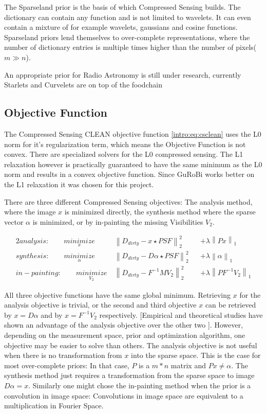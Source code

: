 The Sparseland prior is the basis of which Compressed Sensing builds. The dictionary can contain any function and is not limited to wavelets. It can even contain a mixture of for example wavelets, gaussians and cosine functions. Sparseland priors lend themselves to over-complete representations, where the number of dictionary entries is multiple times higher than the number of pixels($m \gg n$). 

An appropriate prior for Radio Astronomy is still under research, currently Starlets\cite{starck2015starlet} and Curvelets\cite{something} are on top of the foodchain


\subsection{Objective Function}
The Compressed Sensing CLEAN objective function \eqref{intro:eq:csclean} uses the L0 norm for it's regularization term, which means the Objective Function is not convex. There are specialized solvers for the L0 compressed sensing. The L1 relaxation however is practically guaranteed to have the same minimum as the L0 norm and results in a convex objective function. Since GuRoBi works better on the L1 relaxation it was chosen for this project.

There are three different Compressed Sensing objectives: The analysis method, where the image $x$ is minimized directly, the synthesis method where the sparse vector $\alpha$ is minimized, or by in-painting the missing Visibilities $V_2$.

\begin{alignat*}{2}
	analysis:\qquad \underset{x}{minimize} \:& \left \| D_{dirty} - x \star PSF \right \|_2^2 &&+  \lambda \left \| Px \right \|_1 \\
	synthesis:\qquad \underset{\alpha}{minimize} \:& \left \| D_{dirty} - D \alpha \star PSF \right \|_2^2 &&+ \lambda \left \| \alpha \right \|_1 \\
	in-painting:\qquad \underset{V_2}{minimize} \:& \left \|  D_{dirty} - F^{-1} M V_2 \right \|_2^2 &&+ \lambda \left \| PF^{-1}V_2\right \|_1
\end{alignat*}

All three objective functions have the same global minimum. Retrieving $x$ for the analysis objective is trivial, or the second and third objective $x$ can be retrieved by $x = D\alpha$ and by $x = F^{-1}V_2$ respectively. [Empirical and theoretical studies have shown an advantage of the analysis objective over the other two \cite{something}]. However, depending on the measurement space, prior and optimization algorithm, one objective may be easier to solve than others. The analysis objective is not useful when there is no transformation from $x$ into the sparse space. This is the case for most over-complete priors: In that case, $P$ is a $m*n$ matrix and  $Px \ne \alpha$. The synthesis method just requires a transformation from the sparse space to image $D\alpha = x$. Similarly one might chose the in-painting method when the prior is a convolution in image space: Convolutions in image space are equivalent to a multiplication in Fourier Space.



